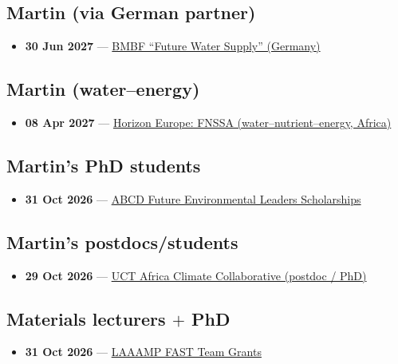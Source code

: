 \subsection*{Martin (via German partner)}
\begin{itemize}[leftmargin=1.4em,itemsep=0.1em]
  \item \textbf{30 Jun 2027} --- \href{https://www.grantbite.com/en/funding/bmbf-future-water-supply-research-funding}{BMBF ``Future Water Supply'' (Germany)}
\end{itemize}

\subsection*{Martin (water--energy)}
\begin{itemize}[leftmargin=1.4em,itemsep=0.1em]
  \item \textbf{08 Apr 2027} --- \href{https://www.horizon-europe.gouv.fr/optimising-water-nutrient-energy-nexus-sustainable-and-climate-smart-agriculture-africa-fnssa-41643}{Horizon Europe: FNSSA (water--nutrient--energy, Africa)}
\end{itemize}

\subsection*{Martin's PhD students}
\begin{itemize}[leftmargin=1.4em,itemsep=0.1em]
  \item \textbf{31 Oct 2026} --- \href{https://opportunityforafrica.org/blog/apply-for-the-abcd-future-environmental-leaders-scholarships-2027-9-month-phd-research-stay-in-germany-for-global-south-scholars/}{ABCD Future Environmental Leaders Scholarships}
\end{itemize}

\subsection*{Martin's postdocs/students}
\begin{itemize}[leftmargin=1.4em,itemsep=0.1em]
  \item \textbf{29 Oct 2026} --- \href{https://acdi.uct.ac.za/africaclimatecollaborative/postdoctoral-research-fellowships-climate-and-development}{UCT Africa Climate Collaborative (postdoc / PhD)}
\end{itemize}

\subsection*{Materials lecturers $+$ PhD}
\begin{itemize}[leftmargin=1.4em,itemsep=0.1em]
  \item \textbf{31 Oct 2026} --- \href{https://laamp.iucr.org/grants/calls/jan-dec-2027}{LAAAMP FAST Team Grants}
\end{itemize}


